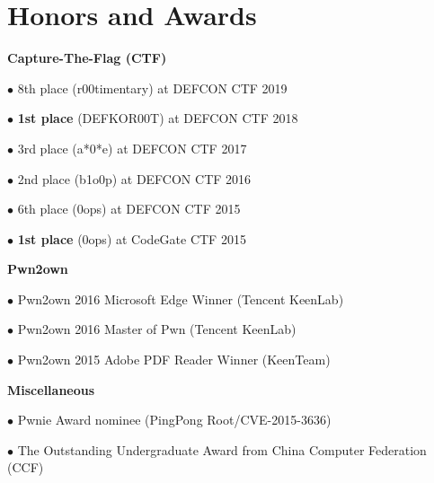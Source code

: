 \section*{Honors and Awards}
\begin{description}
\item{\bf {Capture-The-Flag (CTF)}}
	\item $\bullet$ 8th place (r00timentary) at DEFCON CTF 2019 
	\item $\bullet$ \textbf{1st place} (DEFKOR00T) at DEFCON CTF 2018 
	\item $\bullet$ 3rd place (a*0*e) at DEFCON CTF 2017 
	\item $\bullet$ 2nd place (b1o0p) at DEFCON CTF 2016 
	\item $\bullet$ 6th place (0ops) at DEFCON CTF 2015 
	\item $\bullet$ \textbf{1st place} (0ops) at CodeGate CTF 2015 
\item{\bf {Pwn2own}}
	\item $\bullet$ Pwn2own 2016 Microsoft Edge Winner (Tencent KeenLab) 
	\item $\bullet$ Pwn2own 2016 Master of Pwn (Tencent KeenLab) 
	\item $\bullet$ Pwn2own 2015 Adobe PDF Reader Winner (KeenTeam) 
\item{\bf {Miscellaneous}}
	\item $\bullet$ Pwnie Award nominee (PingPong Root/CVE-2015-3636) 
	\item $\bullet$ The Outstanding Undergraduate Award from China Computer Federation (CCF) 
\end{description}
